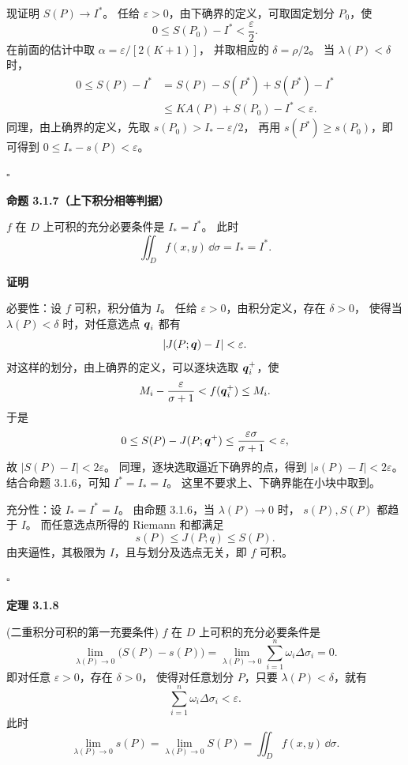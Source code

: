 现证明 $S(P)\to I^*$。
任给 $\varepsilon>0$，由下确界的定义，可取固定划分 $P_0$，使
\[
0\le S(P_0)-I^*<\frac{\varepsilon}{2}.
\]
在前面的估计中取 $\alpha=\varepsilon/[2(K+1)]$，
并取相应的 $\delta=\rho/2$。
当 $\lambda(P)<\delta$ 时，
\[
\begin{aligned}
0\le S(P)-I^*
&=S(P)-S(P^*)+S(P^*)-I^*\\
&\le K A(P)+S(P_0)-I^*
<\varepsilon.
\end{aligned}
\]
同理，由上确界的定义，先取 $s(P_0)>I_*-\varepsilon/2$，
再用 $s(P^*)\ge s(P_0)$，即可得到 $0\le I_*-s(P)<\varepsilon$。


$\square$






\textbf{命题 3.1.7（上下积分相等判据）}


$f$ 在 $D$ 上可积的充分必要条件是 $I_*=I^*$。
此时
\[
\iint_D f(x,y)\,\dd\sigma=I_*=I^*.
\]





\textbf{证明}

必要性：设 $f$ 可积，积分值为 $I$。
任给 $\varepsilon>0$，由积分定义，存在 $\delta>0$，
使得当 $\lambda(P)<\delta$ 时，对任意选点 $\boldsymbol{q}_i$ 都有
\[
|J(P;\boldsymbol{q})-I|<\varepsilon.
\]
对这样的划分，由上确界的定义，可以逐块选取 $\boldsymbol{q}_i^+$，使
\[
M_i-\frac{\varepsilon}{\sigma+1}<f(\boldsymbol{q}_i^+)\le M_i.
\]
于是
\[
0\le S(P)-J(P;\boldsymbol{q}^+)\le
\frac{\varepsilon\sigma}{\sigma+1}<\varepsilon,
\]
故 $|S(P)-I|<2\varepsilon$。
同理，逐块选取逼近下确界的点，得到 $|s(P)-I|<2\varepsilon$。
结合命题 3.1.6，可知 $I^*=I_*=I$。
这里不要求上、下确界能在小块中取到。

充分性：设 $I_*=I^*=I$。
由命题 3.1.6，当 $\lambda(P)\to0$ 时，
$s(P),S(P)$ 都趋于 $I$。
而任意选点所得的 Riemann 和都满足
\[
s(P)\le J(P;q)\le S(P).
\]
由夹逼性，其极限为 $I$，且与划分及选点无关，即 $f$ 可积。


$\square$






\textbf{定理 3.1.8}

(二重积分可积的第一充要条件)
$f$ 在 $D$ 上可积的充分必要条件是
\[
\lim_{\lambda(P)\to0}\bigl(S(P)-s(P)\bigr)
=\lim_{\lambda(P)\to0}\sum_{i=1}^n\omega_i\Delta\sigma_i=0.
\]
即对任意 $\varepsilon>0$，存在 $\delta>0$，
使得对任意划分 $P$，只要 $\lambda(P)<\delta$，就有
\[
\sum_{i=1}^n\omega_i\Delta\sigma_i<\varepsilon.
\]
此时
\[
\lim_{\lambda(P)\to0}s(P)
=\lim_{\lambda(P)\to0}S(P)
=\iint_D f(x,y)\,\dd\sigma.
\]





